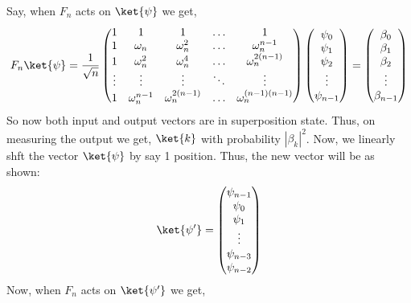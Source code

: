 \documentclass[12pt, oneside]{book}
\theoremstyle{definition}
\theoremstyle{definition}
\theoremstyle{remark}
\begin{document}
\begin{itemize}
        Say, when $F_n$ acts on $\ket{\psi}$ we get,
        \[ F_n\ket{\psi}=\dfrac{1}{\sqrt{n}}\begin{pmatrix} 1 & 1 & 1 & \ldots & 1 \\ 1 & \omega_n & \omega_n^2 & \ldots & \omega_n^{n-1} \\ 1 & \omega_n^2 & \omega_n^4 & \ldots & \omega_n^{2(n-1)} \\ \vdots & \vdots & \vdots & \ddots & \vdots \\ 1 & \omega_n^{n-1} & \omega_n^{2(n-1)} & \ldots & \omega_n^{(n-1)(n-1)} \end{pmatrix}\begin{pmatrix} \psi_0 \\ \psi_1 \\ \psi_2 \\ \vdots \\ \psi_{n-1} \end{pmatrix}=\begin{pmatrix} \beta_0 \\ \beta_1 \\ \beta_2 \\ \vdots \\ \beta_{n-1} \end{pmatrix} \]
        So now both input and output vectors are in superposition state. Thus, on measuring the output we get,
        $\ket{k}$ with probability $|\beta_k|^2$. Now, we linearly shft the vector $\ket{\psi}$ by say 1 position. Thus, the new vector will be as shown:
        \[ \ket{\psi'}=\begin{pmatrix} \psi_{n-1} \\ \psi_0 \\ \psi_1 \\ \vdots \\ \psi_{n-3} \\ \psi_{n-2} \end{pmatrix} \]
        Now, when $F_n$ acts on $\ket{\psi'}$ we get,

\end{itemize}
\end{document}
